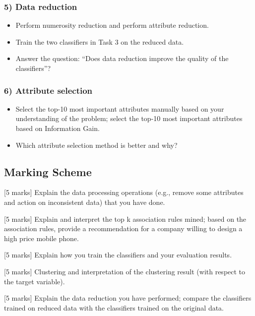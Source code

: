 \documentclass[11pt]{article}
\providecommand{\tightlist}{%
      \setlength{\itemsep}{0pt}\setlength{\parskip}{0pt}}
\begin{document}
\hypertarget{data-reduction}{%
\subsubsection{5) Data reduction}\label{data-reduction}}

\begin{itemize}
\tightlist
\item
  Perform numerosity reduction and perform attribute reduction.
\item
  Train the two classifiers in Task 3 on the reduced data.
\item
  Answer the question: ``Does data reduction improve the quality of the
  classifiers''?
\end{itemize}

\hypertarget{attribute-selection}{%
\subsubsection{6) Attribute selection}\label{attribute-selection}}

\begin{itemize}
\tightlist
\item
  Select the top-10 most important attributes manually based on your
  understanding of the problem; select the top-10 most important
  attributes based on Information Gain.
\item
  Which attribute selection method is better and why?
\end{itemize}

\hypertarget{marking-scheme}{%
\subsection{\texorpdfstring{\textbf{Marking
Scheme}}{Marking Scheme}}\label{marking-scheme}}

{[}5 marks{]} Explain the data processing operations (e.g., remove some
attributes and action on inconsistent data) that you have done.

{[}5 marks{]} Explain and interpret the top k association rules mined;
based on the association rules, provide a recommendation for a company
willing to design a high price mobile phone.

{[}5 marks{]} Explain how you train the classifiers and your evaluation
results.

{[}5 marks{]} Clustering and interpretation of the clustering result
(with respect to the target variable).

{[}5 marks{]} Explain the data reduction you have performed; compare the
classifiers trained on reduced data with the classifiers trained on the
original data.
\end{document}
